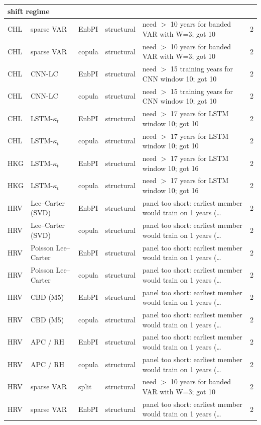 {\begin{longtable}{@{}lllp{1.6cm}p{6.2cm}r@{}}
\multicolumn{6}{l}{\textbf{shift regime}} \\
\midrule
CHL & sparse VAR & EnbPI & structural & need $>$ 10 years for banded VAR with W=3; got 10 & 2 \\
CHL & sparse VAR & copula & structural & need $>$ 10 years for banded VAR with W=3; got 10 & 2 \\
CHL & CNN-LC & EnbPI & structural & need $>$ 15 training years for CNN window 10; got 10 & 2 \\
CHL & CNN-LC & copula & structural & need $>$ 15 training years for CNN window 10; got 10 & 2 \\
CHL & LSTM-$\kappa_t$ & EnbPI & structural & need $>$ 17 years for LSTM window 10; got 10 & 2 \\
CHL & LSTM-$\kappa_t$ & copula & structural & need $>$ 17 years for LSTM window 10; got 10 & 2 \\
HKG & LSTM-$\kappa_t$ & EnbPI & structural & need $>$ 17 years for LSTM window 10; got 16 & 2 \\
HKG & LSTM-$\kappa_t$ & copula & structural & need $>$ 17 years for LSTM window 10; got 16 & 2 \\
HRV & Lee--Carter (SVD) & EnbPI & structural & panel too short: earliest member would train on 1 years (\ldots & 2 \\
HRV & Lee--Carter (SVD) & copula & structural & panel too short: earliest member would train on 1 years (\ldots & 2 \\
HRV & Poisson Lee--Carter & EnbPI & structural & panel too short: earliest member would train on 1 years (\ldots & 2 \\
HRV & Poisson Lee--Carter & copula & structural & panel too short: earliest member would train on 1 years (\ldots & 2 \\
HRV & CBD (M5) & EnbPI & structural & panel too short: earliest member would train on 1 years (\ldots & 2 \\
HRV & CBD (M5) & copula & structural & panel too short: earliest member would train on 1 years (\ldots & 2 \\
HRV & APC / RH & EnbPI & structural & panel too short: earliest member would train on 1 years (\ldots & 2 \\
HRV & APC / RH & copula & structural & panel too short: earliest member would train on 1 years (\ldots & 2 \\
HRV & sparse VAR & split & structural & need $>$ 10 years for banded VAR with W=3; got 10 & 2 \\
HRV & sparse VAR & EnbPI & structural & panel too short: earliest member would train on 1 years (\ldots & 2 \\

\end{longtable}}
